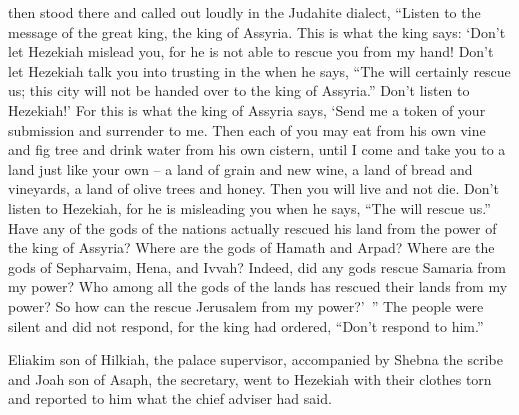 {then stood
there and called out
loudly
in the Judahite dialect, “Listen
to the message
of the great
king,
the king
of Assyria.
This is what
the king
says: ‘Don’t
let Hezekiah
mislead
you, for
he is not
able
to rescue
you from my hand!
Don’t
let Hezekiah
talk you into
trusting
in the
{}
when he says,
“The
{}
will certainly rescue
us; this
city
will not
be handed
over to the king
of Assyria.”
Don’t
listen
to
Hezekiah!’ For
this is what
the king
of Assyria
says,
‘Send
me a token of your submission
and surrender
to
me. Then each
of you may eat
from his own
vine
and fig tree
and drink
water
from his own
cistern,
until
I come
and take
you to
a land just like your own – a land of grain and new wine, a land of bread and vineyards, a land of olive trees and honey. Then you will live and not die. Don’t listen to Hezekiah, for he is misleading you when he says, “The
{} will rescue us.”
Have
any of the gods
of the nations
actually
rescued
his land
from the power
of the king
of Assyria?
Where
are the gods
of Hamath
and Arpad? Where
are the gods
of Sepharvaim,
Hena,
and Ivvah? Indeed,
did any gods rescue
Samaria
from my power?
Who
among all
the gods
of the lands
has
rescued
their lands
from my power? So how can the
{}
rescue
Jerusalem
from my power?’ ”
The people
were silent
and did not
respond,
for
the king
had ordered,
“Don’t
respond to him.”
\par }{\PP {}Eliakim
son
of Hilkiah,
the palace
supervisor, accompanied by Shebna
the scribe
and Joah
son
of Asaph,
the secretary,
went to
Hezekiah
with their clothes
torn
and reported
to him what
the chief adviser had said.

}
